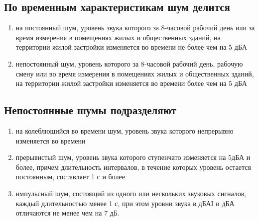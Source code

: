 \documentclass[a5paper, 12pt, twoside]{article}
\begin{document}
\subsection{По временным характеристикам шум делится}
\begin{enumerate}
    \item на постоянный шум, уровень звука которого за 8-часовой рабочий день или за время измерения в помещениях жилых и общественных зданий, на территории жилой застройки изменяется во времени не более чем на 5 дБА
    \item непостоянный шум, уровень которого за 8-часовой рабочий день, рабочую смену или во время измерения в помещениях жилых и общественных зданий, на территории жилой застройки изменяется во времени более чем на 5 дБА
\end{enumerate}
\subsection{Непостоянные шумы подразделяют}
\begin{enumerate}
    \item на колеблющийся во времени шум, уровень звука которого непрерывно изменяется во времени
    \item прерывистый шум, уровень звука которого ступенчато изменяется на 5дБА и более, причем длительность интервалов, в течение которых уровень остается постоянным, составляет 1 с и более
    \item импульсный шум, состоящий из одного или нескольких звуковых сигналов, каждый длительностью менее 1 с, при этом уровни звука в дБАI и дБА отличаются не менее чем на 7 дБ.
\end{enumerate}
\end{document}
